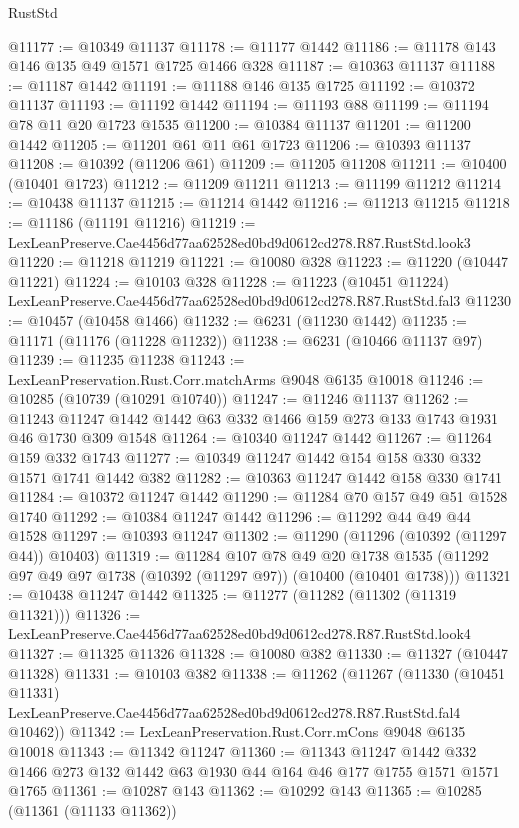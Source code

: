 \begin{lexlean}{RustStd}
\begin{coremodule}
{{@11177 := @10349 @11137
@11178 := @11177 @1442
@11186 := @11178 @143 @146 @135 @49 @1571 @1725 @1466 @328
@11187 := @10363 @11137
@11188 := @11187 @1442
@11191 := @11188 @146 @135 @1725
@11192 := @10372 @11137
@11193 := @11192 @1442
@11194 := @11193 @88
@11199 := @11194 @78 @11 @20 @1723 @1535
@11200 := @10384 @11137
@11201 := @11200 @1442
@11205 := @11201 @61 @11 @61 @1723
@11206 := @10393 @11137
@11208 := @10392 (@11206 @61)
@11209 := @11205 @11208
@11211 := @10400 (@10401 @1723)
@11212 := @11209 @11211
@11213 := @11199 @11212
@11214 := @10438 @11137
@11215 := @11214 @1442
@11216 := @11213 @11215
@11218 := @11186 (@11191 @11216)
@11219 := LexLeanPreserve.Cae4456d77aa62528ed0bd9d0612cd278.R87.RustStd.look3
@11220 := @11218 @11219
@11221 := @10080 @328
@11223 := @11220 (@10447 @11221)
@11224 := @10103 @328
@11228 := @11223 (@10451 @11224) LexLeanPreserve.Cae4456d77aa62528ed0bd9d0612cd278.R87.RustStd.fal3
@11230 := @10457 (@10458 @1466)
@11232 := @6231 (@11230 @1442)
@11235 := @11171 (@11176 (@11228 @11232))
@11238 := @6231 (@10466 @11137 @97)
@11239 := @11235 @11238
@11243 := LexLeanPreservation.Rust.Corr.matchArms @9048 @6135 @10018
@11246 := @10285 (@10739 (@10291 @10740))
@11247 := @11246 @11137
@11262 := @11243 @11247 @1442 @1442 @63 @332 @1466 @159 @273 @133 @1743 @1931 @46 @1730 @309 @1548
@11264 := @10340 @11247 @1442
@11267 := @11264 @159 @332 @1743
@11277 := @10349 @11247 @1442 @154 @158 @330 @332 @1571 @1741 @1442 @382
@11282 := @10363 @11247 @1442 @158 @330 @1741
@11284 := @10372 @11247 @1442
@11290 := @11284 @70 @157 @49 @51 @1528 @1740
@11292 := @10384 @11247 @1442
@11296 := @11292 @44 @49 @44 @1528
@11297 := @10393 @11247
@11302 := @11290 (@11296 (@10392 (@11297 @44)) @10403)
@11319 := @11284
    @107
    @78
    @49
    @20
    @1738
    @1535
    (@11292 @97 @49 @97 @1738 (@10392 (@11297 @97)) (@10400 (@10401 @1738)))
@11321 := @10438 @11247 @1442
@11325 := @11277 (@11282 (@11302 (@11319 @11321)))
@11326 := LexLeanPreserve.Cae4456d77aa62528ed0bd9d0612cd278.R87.RustStd.look4
@11327 := @11325 @11326
@11328 := @10080 @382
@11330 := @11327 (@10447 @11328)
@11331 := @10103 @382
@11338 := @11262
    (@11267
      (@11330
        (@10451 @11331)
        LexLeanPreserve.Cae4456d77aa62528ed0bd9d0612cd278.R87.RustStd.fal4
        @10462))
@11342 := LexLeanPreservation.Rust.Corr.mCons @9048 @6135 @10018
@11343 := @11342 @11247
@11360 := @11343
    @11247
    @1442
    @332
    @1466
    @273
    @132
    @1442
    @63
    @1930
    @44
    @164
    @46
    @177
    @1755
    @1571
    @1571
    @1765
@11361 := @10287 @143
@11362 := @10292 @143
@11365 := @10285 (@11361 (@11133 @11362))
}}
\end{coremodule}
\end{lexlean}
